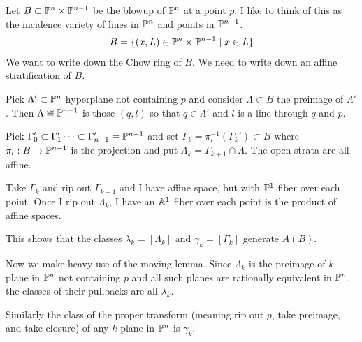 \documentclass[12pt]{article}
\begin{document}
\begin{example}
    Let $B\subset \P^n\times \P^{n-1}$ be the blowup of $\P^n$ at a point $p$. I like to think of
    this as the incidence variety of lines in $\P^n$ and points in $\P^{n-1}$. \begin{align*}
        B = \{(x,L) \in \P^n\times \P^{n-1}\mid x\in L\}
    \end{align*}
    We want to write down the Chow ring of $B$. We need to write down an affine stratification of $B$.

    \hfill

    Pick $\Lambda' \subset \P^n$ hyperplane not containing $p$ and consider $\Lambda \subset B$ the preimage of $\Lambda'$.
    Then $\Lambda \cong \P^{n-1}$ is those $(q,l)$ so that $q\in \Lambda'$ and $l$ is a line through $q$ and $p$.

    \hfill

    Pick $\Gamma_0' \subset \Gamma_1'\dots \subset \Gamma_{n-1}' = \P^{n-1}$ and set
    $\Gamma_k = \pi_l^{-1}(\Gamma_k')\subset B$ where $\pi_l:B\to \P^{n-1}$ is the projection and put 
    $\Lambda_k = \Gamma_{k+1} \cap \Lambda$. 
    The open strata are all affine. 

    \hfill

    Take $\Gamma_k$ and rip out $\Gamma_{k-1}$ and I have affine space, but with $\P^1$ fiber over each point.
    Once I rip out $\Lambda_k$, I have an $\A^1$ fiber over each point is the product of affine spaces. 

    \hfill

    This shows that the classes $\lambda_k = [\Lambda_k]$ and $\gamma_k = [\Gamma_k]$ generate $A(B)$.

    \hfill

    Now we make heavy use of the moving lemma. Since $\Lambda_k$ is the preimage of $k$-plane in $\P^n$
    not containing $p$ and all such planes are rationally equivalent in $\P^n$, 
    the classes of their pullbacks are all $\lambda_k$.

    \hfill

    Similarly the class of the proper transform (meaning rip out $p$, take preimage, and take closure) 
    of any $k$-plane in $\P^n$ is $\gamma_k$. 


\end{example}
\end{document}
